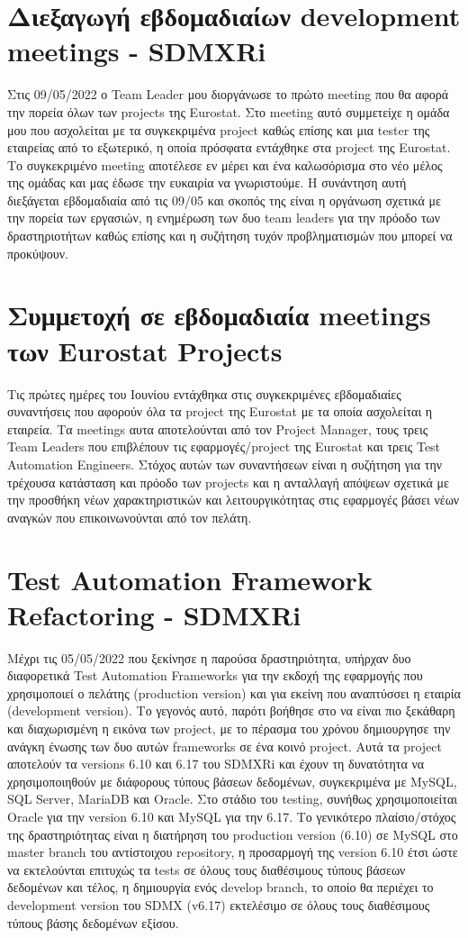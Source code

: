 \section*{Διεξαγωγή εβδομαδιαίων development meetings - SDMXRi}
Στις 09/05/2022 ο Team Leader μου διοργάνωσε το πρώτο meeting που θα αφορά την πορεία όλων των projects της Eurostat. Στο meeting αυτό συμμετείχε η ομάδα 
μου που ασχολείται με τα συγκεκριμένα project καθώς επίσης και μια tester της εταιρείας από το εξωτερικό, η οποία πρόσφατα εντάχθηκε στα project της Eurostat. 
Το συγκεκριμένο meeting αποτέλεσε εν μέρει και ένα καλωσόρισμα στο νέο μέλος της ομάδας και μας έδωσε την ευκαιρία να γνωριστούμε. Η συνάντηση αυτή διεξάγεται 
εβδομαδιαία από τις 09/05 και σκοπός της είναι η οργάνωση σχετικά με την πορεία των εργασιών, η ενημέρωση των δυο team leaders για την πρόοδο 
των δραστηριοτήτων καθώς επίσης και η συζήτηση τυχόν προβληματισμών που μπορεί να προκύψουν.

\section*{Συμμετοχή σε εβδομαδιαία meetings των Eurostat Projects}
Τις πρώτες ημέρες του Ιουνίου εντάχθηκα στις συγκεκριμένες εβδομαδιαίες συναντήσεις που αφορούν όλα τα project της Eurostat με τα οποία ασχολείται η εταιρεία. Τα meetings αυτα αποτελούνται από 
τον Project Manager, τους τρεις Team Leaders που επιβλέπουν τις εφαρμογές/project της Eurostat και τρεις Test Automation Engineers. Στόχος αυτών των συναντήσεων είναι η συζήτηση για την τρέχουσα κατάσταση 
και πρόοδο των projects και η ανταλλαγή απόψεων σχετικά με την προσθήκη νέων χαρακτηριστικών και λειτουργικότητας στις εφαρμογές βάσει νέων αναγκών που επικοινωνούνται από τον πελάτη.

\section*{Test Automation Framework Refactoring - SDMXRi}
Μέχρι τις 05/05/2022 που ξεκίνησε η παρούσα δραστηριότητα, υπήρχαν δυο διαφορετικά Test Automation Frameworks για την εκδοχή της εφαρμογής που χρησιμοποιεί ο πελάτης (production version) και για εκείνη που 
αναπτύσσει η εταιρία (development version). Το γεγονός αυτό, παρότι βοήθησε στο να είναι πιο ξεκάθαρη και διαχωρισμένη η εικόνα των project, με το 
πέρασμα του χρόνου δημιουργησε την ανάγκη ένωσης των δυο αυτών frameworks σε ένα κοινό project. Αυτά τα project αποτελούν τα versions 6.10 και 6.17 του SDMXRi 
και έχουν τη δυνατότητα να χρησιμοποιηθούν με διάφορους τύπους βάσεων δεδομένων, συγκεκριμένα με MySQL, SQL Server, MariaDB και Oracle. Στο στάδιο του testing, 
συνήθως χρησιμοποιείται Oracle για την version 6.10 και MySQL για την 6.17. Το γενικότερο πλαίσιο/στόχος της δραστηριότητας είναι η διατήρηση του production 
version (6.10) σε MySQL στο master branch του αντίστοιχου repository, η προσαρμογή της version 6.10 έτσι ώστε να εκτελούνται επιτυχώς τα tests σε όλους τους διαθέσιμους τύπους βάσεων δεδομένων και 
τέλος, η δημιουργία ενός develop branch, το οποίο θα περιέχει το development version του SDMX (v6.17) εκτελέσιμο σε όλους τους διαθέσιμους τύπους βάσης δεδομένων εξίσου. \\

